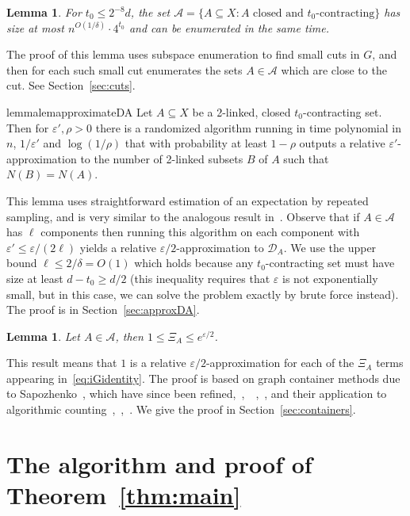 \documentclass[11pt,letterpaper]{amsart}
\newtheorem{lemma}[theorem]{Lemma}
\theoremstyle{definition}
\newcommand{\eps}{\varepsilon}
\renewcommand{\subset}{\subseteq}
\begin{document}
\begin{lemma}\label{lem:enumeratecontracting}
    For $t_0 \leq 2^{-8}d$, the set $\mathcal{A}=\{A\subset X : A\text{ closed and $t_0$-contracting}\}$ has size at most $n^{O(1/\delta)}\cdot 4^{t_0}$ and can be enumerated in the same time.
\end{lemma}

The proof of this lemma uses subspace enumeration to find small cuts in $G$, and then for each such small cut enumerates the sets $A\in\mathcal{A}$ which are close to the cut. See Section~\ref{sec:cuts}.

\begin{restatable}{lemma}{lemapproximateDA}\label{lem:approximateDA}
    Let $A\subset X$ be a 2-linked, closed $t_0$-contracting set. Then for $\eps', \rho>0$ there is a randomized algorithm running in time polynomial in $n$, $1/\eps'$ and $\log(1/\rho)$ that with probability at least $1-\rho$ outputs a relative $\eps'$-approximation to the number of 2-linked subsets $B$ of $A$ such that $N(B)=N(A)$.
\end{restatable}

This lemma uses straightforward estimation of an expectation by repeated sampling, and is very similar to the analogous result in~\cite{JPP22}.
Observe that if $A\in\mathcal A$ has $\ell$ components then running this algorithm on each component with $\eps'\le \eps/(2\ell)$ yields a relative $\eps/2$-approximation to $\mathcal{D}_A$. We use the upper bound $\ell \le 2/\delta = O(1)$ which holds because any $t_0$-contracting set must have size at least $d-t_0\ge d/2$ (this inequality requires that $\eps$ is not exponentially small, but in this case, we can solve the problem exactly by brute force instead).
The proof is in Section~\ref{sec:approxDA}.

\begin{lemma}\label{lem:polymers}
    Let $A\in\mathcal{A}$, then $1\le \Xi_A\le e^{\eps/2}$.
\end{lemma}

This result means that $1$ is a relative $\eps/2$-approximation for each of the $\Xi_A$ terms appearing in~\eqref{eq:iGidentity}. 
The proof is based on graph container methods due to Sapozhenko~\cite{S87,S01b}, which have since been refined,~\cite{GT06},~\cite{GALVIN08}~\cite{KP22},~\cite{PARK22}, and their application to algorithmic counting~\cite{JP20},~\cite{JPP21},~\cite{JPP22}. We give the proof in Section~\ref{sec:containers}.

\section{The algorithm and proof of Theorem~\texorpdfstring{\ref{thm:main}}{\ref*{thm:main}}}
\end{document}
